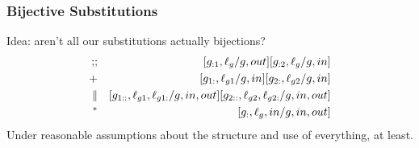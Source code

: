 \subsubsection{Bijective Substitutions}

Idea: aren't all our substitutions actually bijections?
\begin{eqnarray*}
   \mathbin{;\!;}
   &&
   [g_{:1},\ell_g/g,out]
   [g_{:2},\ell_g/g,in]
\\ +
   &&
   [g_{1:},\ell_{g1}/g,in]
   [g_{2:},\ell_{g2}/g,in]
\\ \parallel
   &&
   [g_{1::},\ell_{g1},\ell_{g1:}/g,in,out]
   [g_{2::},\ell_{g2},\ell_{g2:}/g,in,out]
\\ {}^*
   &&
   [g_{:},\ell_g,in/g,in,out]
\end{eqnarray*}
Under reasonable assumptions about the structure and use of everything,
at least.

